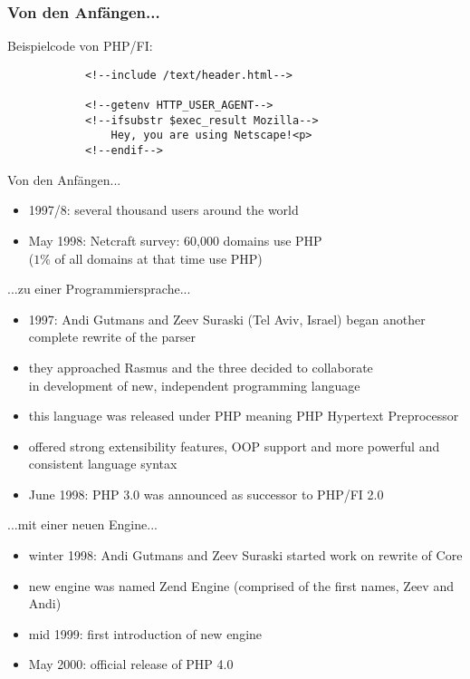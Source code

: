 \documentclass{beamer}
\begin{document}
	\begin{frame}[fragile]
		\frametitle{Von den Anfängen...}
		Beispielcode von PHP/FI:
		\begin{verbatim}
			<!--include /text/header.html-->
		
			<!--getenv HTTP_USER_AGENT-->
			<!--ifsubstr $exec_result Mozilla-->
			    Hey, you are using Netscape!<p>
			<!--endif-->
		\end{verbatim}
	\end{frame}
	
	\begin{frame}{Von den Anfängen...}
		\begin{itemize}
			\item 1997/8: several thousand users around the world
			\item May 1998: Netcraft survey: 60,000 domains use PHP \\ ($1\%$ of all domains at that time use PHP)
		\end{itemize}
	\end{frame}
	
	\begin{frame}{...zu einer Programmiersprache...}
		\begin{itemize}
			\item 1997: Andi Gutmans and Zeev Suraski (Tel Aviv, Israel) began another complete rewrite of the parser
			\item they approached Rasmus and the three decided to collaborate \\
			in development of new, independent programming language
			\item this language was released under PHP meaning PHP Hypertext Preprocessor
			\item offered strong extensibility features, OOP support and more powerful and consistent language syntax
			\item June 1998: PHP 3.0 was announced as successor to PHP/FI 2.0
		\end{itemize}
	\end{frame}
	
	\begin{frame}{...mit einer neuen Engine...}
		\begin{itemize}
			\item winter 1998: Andi Gutmans and Zeev Suraski started work on rewrite of Core
			\item new engine was named Zend Engine (comprised of the first names, Zeev and Andi)
			\item mid 1999: first introduction of new engine
			\item May 2000: official release of PHP 4.0
		\end{itemize}
	\end{frame}
	
\end{document}
